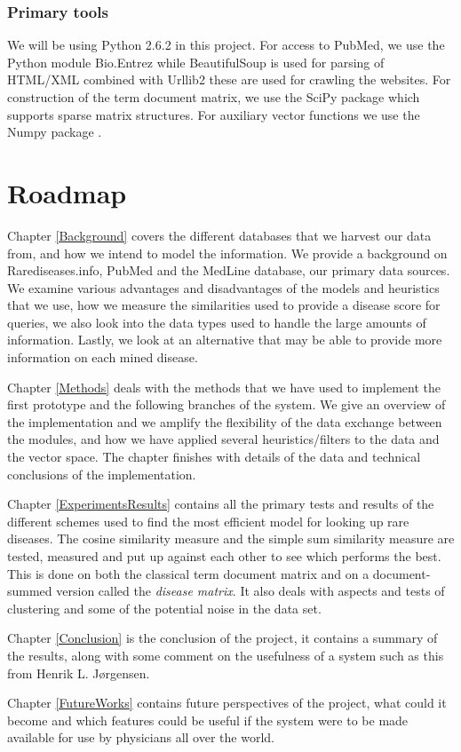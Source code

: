 
\subsubsection{Primary tools}
We will be using Python 2.6.2 \cite{PythonLanguage} in this project. For access to PubMed, we use
the Python module Bio.Entrez \cite{EntrezProgUtil} while BeautifulSoup
\cite{BS} is used for parsing of HTML/XML combined with Urllib2
\cite{UL2} these are used for crawling the websites. For construction
of the term document matrix, we use the SciPy package \cite{SciPy}
which supports sparse matrix structures. For auxiliary vector
functions we use the Numpy package \cite{NumPy}.

\section{Roadmap}

Chapter \ref{Background} covers the different databases that we
harvest our data from, and how we intend to model the
information. We provide a background on Rarediseases.info, PubMed and
the MedLine database, our primary data sources. We examine various
advantages and disadvantages of the models and heuristics that we use,
how we measure the similarities used to provide a disease score for
queries, we also look into the data types used to handle the large
amounts of information. Lastly, we look at an alternative that may
be able to provide more information on each mined disease.

Chapter \ref{Methods} deals with the methods that we have used to
implement the first prototype and the following branches of the
system. We give an overview of the implementation and we amplify the
flexibility of the data exchange between the modules, and how we have
applied several heuristics/filters to the data and the vector
space. The chapter finishes with details of the data and technical
conclusions of the implementation.

Chapter \ref{ExperimentsResults} contains all the primary tests and
results of the different schemes used to find the most efficient model
for looking up rare diseases. The cosine similarity measure and the
simple sum similarity measure are tested, measured and put up against
each other to see which performs the best. This is done on both the
classical term document matrix and on a document-summed version called
the \textit{disease matrix}. It also deals with aspects and tests of
clustering and some of the potential noise in the data set.

Chapter \ref{Conclusion} is the conclusion of the project, it contains
a summary of the results, along with some comment on the usefulness of
a system such as this from Henrik L. J\o rgensen.


Chapter \ref{FutureWorks} contains future perspectives of the project,
what could it become and which features could be useful if the system
were to be made available for use by physicians all over the world.

